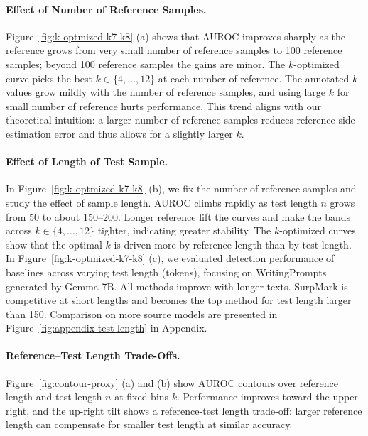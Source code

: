 \documentclass{article}
\theoremstyle{plain}
\theoremstyle{definition}
\theoremstyle{remark}
\begin{document}
\vspace{-3mm}
\paragraph{Effect of Number of Reference Samples.}
Figure~\ref{fig:k-optmized-k7-k8} (a) shows that AUROC improves sharply as the reference grows from very small number of reference samples to 100 reference samples; beyond 100 reference samples the gains are minor. The $k$-optimized curve picks the best $k \in \{4,\dots,12\}$ at each number of reference. The annotated $k$ values grow mildly with the number of reference samples, and using large $k$ for small number of reference hurts performance. This trend aligns with our theoretical intuition: a larger number of reference samples reduces reference-side estimation error and thus allows for a slightly larger $k$.
\vspace{-3mm}
\paragraph{Effect of Length of Test Sample.} In Figure~\ref{fig:k-optmized-k7-k8} (b), we fix the number of reference samples and study the effect of sample length. AUROC climbs rapidly as test length $n$ grows from 50 to about 150–200. Longer reference lift the curves and make the bands across $k \in \{4, \dots,12\}$ tighter, indicating greater stability. The $k$-optimized curves show that the optimal $k$ is driven more by reference length than by test length. In Figure~\ref{fig:k-optmized-k7-k8} (c), we evaluated detection performance of baselines across varying test length (tokens), focusing on WritingPrompts generated by Gemma-7B. All methods improve with longer texts. SurpMark is competitive at short lengths and becomes the top method for test length larger than 150. Comparison on more source models are presented in Figure~\ref{fig:appendix-test-length} in Appendix.
\vspace{-3mm}
\paragraph{Reference–Test Length Trade-Offs.} Figure~\ref{fig:contour-proxy} (a) and (b) show AUROC contours over reference length and test length $n$ at fixed bins $k$. Performance improves toward the upper-right, and the up-right tilt shows a reference-test length trade-off: larger reference length can compensate for smaller test length at similar accuracy. 
\end{document}
